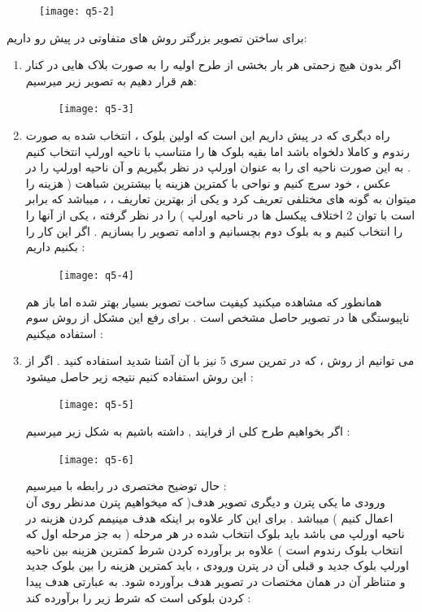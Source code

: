 \documentclass[a4paper]{article}
\begin{document}
\begin{figure}[H]
	\centering
	\texttt{[image: q5-2]}
	\caption{}
	\label{7}
\end{figure}
برای ساختن تصویر بزرگتر روش های متفاوتی در پیش رو داریم: 


\begin{enumerate}
	\item 
	اگر بدون هیچ زحمتی هر بار بخشی از طرح اولیه را به صورت بلاک هایی در کنار هم قرار دهیم به تصویر زیر میرسیم: 
	\begin{figure}[H]
		\centering
		\texttt{[image: q5-3]}
		\caption{}
		\label{8}
	\end{figure}
	\item
	راه دیگری که در پیش داریم این است که اولین بلوک
	، 
	 انتخاب شده به صورت رندوم و کاملا دلخواه  باشد اما بقیه بلوک ها را متناسب با ناحیه اورلپ انتخاب کنیم . به این صورت ناحیه ای را به عنوان اورلپ در نظر بگیریم  و آن ناحیه اورلپ را در عکس
	 ، 
	 خود سرچ کنیم و نواحی با کمترین هزینه یا بیشترین شباهت ( هزینه را میتوان به گونه های مختلفی تعریف کرد و یکی از بهترین تعاریف ،
	  ، 
	  میباشد که برابر است با توان 2 اختلاف پیکسل ها در ناحیه اورلپ ) را در نظر گرفته  ، یکی از آنها را  را انتخاب کنیم و به بلوک دوم بچسبانیم  و ادامه تصویر را بسازیم . اگر این کار را بکنیم داریم : 
	  \begin{figure}[H]
	  	\centering
	  	\texttt{[image: q5-4]}
	  	\caption{}
	  	\label{9}
	  \end{figure}
  همانطور که مشاهده میکنید کیفیت ساخت تصویر بسیار بهتر شده اما باز هم ناپیوستگی ها در تصویر حاصل مشخص است . برای رفع این مشکل از روش سوم استفاده میکنیم :
	\item
	می توانیم از روش
	 ، 
	 که در تمرین سری 5 نیز با آن آشنا شدید استفاده کنید . اگر از این روش استفاده کنیم نتیجه زیر حاصل میشود :  
\begin{figure}[H]
	\centering
	\texttt{[image: q5-5]}
	\caption{}
	\label{10}
\end{figure}
اگر بخواهیم طرح کلی از فرایند
  ,
  داشته باشیم به شکل زیر میرسیم : 
\begin{figure}[H]
	\centering
	\texttt{[image: q5-6]}
	\caption{}
	\label{11}
\end{figure}
	حال توضیح مختصری در رابطه  با
	 میرسیم : 
	 \\
	 ورودی ما یکی پترن
	 و دیگری تصویر هدف( که میخواهیم پترن مدنظر روی آن اعمال کنیم ) میباشد .   برای این کار علاوه بر اینکه هدف مینیمم کردن هزینه در ناحیه اورلپ می باشد باید بلوک انتخاب شده در هر مرحله ( به جز مرحله اول که انتخاب بلوک رندوم است ) علاوه بر برآورده کردن شرط کمترین هزینه بین ناحیه اورلپ بلوک جدید و قبلی آن در پترن ورودی ، باید کمترین هزینه را  بین بلوک جدید و متناظر آن در همان مختصات در تصویر هدف برآورده شود. به عبارتی هدف پیدا کردن بلوکی است که شرط زیر را برآورده کند : 

\end{enumerate}
\end{document}
